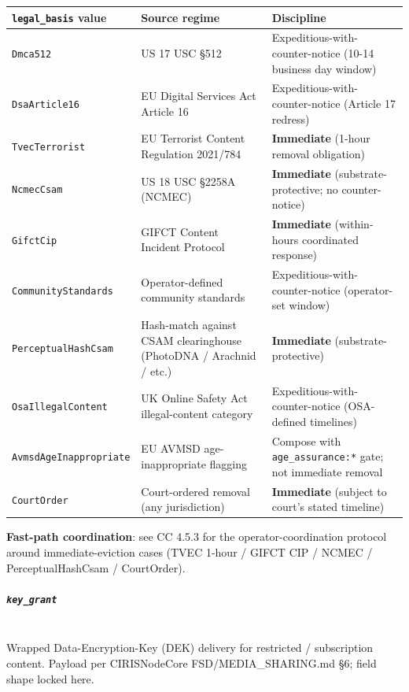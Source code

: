 \documentclass[11pt]{article}
\begin{document}
{\footnotesize
\begin{longtable}{|p{5.33cm}|p{5.33cm}|p{5.33cm}|}\hline
\textbf{\texttt{legal\_basis} value} & \textbf{Source regime} & \textbf{Discipline} \\ \hline\endhead
\texttt{Dmca512} & US 17 USC §512 & Expeditious-with-counter-notice (10-14 business day window) \\ \hline
\texttt{DsaArticle16} & EU Digital Services Act Article 16 & Expeditious-with-counter-notice (Article 17 redress) \\ \hline
\texttt{TvecTerrorist} & EU Terrorist Content Regulation 2021/784 & \textbf{Immediate} (1-hour removal obligation) \\ \hline
\texttt{NcmecCsam} & US 18 USC §2258A (NCMEC) & \textbf{Immediate} (substrate-protective; no counter-notice) \\ \hline
\texttt{GifctCip} & GIFCT Content Incident Protocol & \textbf{Immediate} (within-hours coordinated response) \\ \hline
\texttt{CommunityStandards} & Operator-defined community standards & Expeditious-with-counter-notice (operator-set window) \\ \hline
\texttt{PerceptualHashCsam} & Hash-match against CSAM clearinghouse (PhotoDNA / Arachnid / etc.) & \textbf{Immediate} (substrate-protective) \\ \hline
\texttt{OsaIllegalContent} & UK Online Safety Act illegal-content category & Expeditious-with-counter-notice (OSA-defined timelines) \\ \hline
\texttt{AvmsdAgeInappropriate} & EU AVMSD age-inappropriate flagging & Compose with \texttt{age\_assurance:*} gate; not immediate removal \\ \hline
\texttt{CourtOrder} & Court-ordered removal (any jurisdiction) & \textbf{Immediate} (subject to court's stated timeline) \\ \hline
\end{longtable}}


\textbf{Fast-path coordination}: see CC 4.5.3 for the operator-coordination protocol around immediate-eviction cases (TVEC 1-hour / GIFCT CIP / NCMEC / PerceptualHashCsam / CourtOrder).


\subparagraph{\texttt{key\_grant}}\mbox{}\\


Wrapped Data-Encryption-Key (DEK) delivery for restricted / subscription content. Payload per CIRISNodeCore FSD/MEDIA\_SHARING.md §6; field shape locked here.
\end{document}
